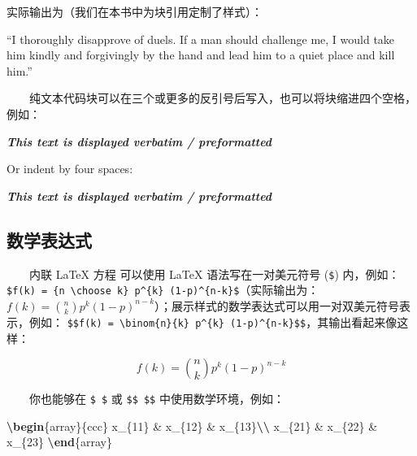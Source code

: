\documentclass[
  12pt,
]{krantz}
\newenvironment{Shaded}{\begin{snugshade}}{\end{snugshade}}
\newcommand{\ExtensionTok}[1]{#1}
\newcommand{\InformationTok}[1]{\textcolor[rgb]{0.56,0.35,0.01}{\textbf{\textit{#1}}}}
\newcommand{\KeywordTok}[1]{\textcolor[rgb]{0.13,0.29,0.53}{\textbf{#1}}}
\newcommand{\NormalTok}[1]{#1}
\newcommand{\SpecialCharTok}[1]{\textcolor[rgb]{0.81,0.36,0.00}{\textbf{#1}}}
\newcommand{\SpecialStringTok}[1]{\textcolor[rgb]{0.31,0.60,0.02}{#1}}
\renewenvironment{quote}{\begin{VF}}{\end{VF}}
\theoremstyle{definition}
\theoremstyle{definition}
\theoremstyle{definition}
\theoremstyle{definition}
\theoremstyle{remark}
\begin{document}
实际输出为（我们在本书中为块引用定制了样式）：

\begin{quote}
``I thoroughly disapprove of duels. If a man should challenge me,
I would take him kindly and forgivingly by the hand and lead him
to a quiet place and kill him.''

\end{quote}

  纯文本代码块可以在三个或更多的反引号后写入，也可以将块缩进四个空格，例如：

\begin{Shaded}
\begin{Highlighting}[]
\InformationTok{\textasciigrave{}\textasciigrave{}\textasciigrave{}}
\InformationTok{This text is displayed verbatim / preformatted}
\InformationTok{\textasciigrave{}\textasciigrave{}\textasciigrave{}}

\NormalTok{Or indent by four spaces:}

\InformationTok{    This text is displayed verbatim / preformatted}
\end{Highlighting}
\end{Shaded}

\hypertarget{ux6570ux5b66ux8868ux8fbeux5f0f}{%
\subsection{数学表达式}\label{ux6570ux5b66ux8868ux8fbeux5f0f}}

  内联 LaTeX 方程 可以使用 LaTeX 语法写在一对美元符号 (\texttt{\$}) 内，例如：\texttt{\$f(k)\ =\ \{n\ \textbackslash{}choose\ k\}\ p\^{}\{k\}\ (1-p)\^{}\{n-k\}\$}（实际输出为：\(f(k)=\binom{n}{k}p^{k}(1-p)^{n-k}\)）；展示样式的数学表达式可以用一对双美元符号表示，例如： \texttt{\$\$f(k)\ =\ \textbackslash{}binom\{n\}\{k\}\ p\^{}\{k\}\ (1-p)\^{}\{n-k\}\$\$}，其输出看起来像这样：

\[f\left(k\right)=\binom{n}{k}p^k\left(1-p\right)^{n-k}\]

  你也能够在 \texttt{\$\ \$} 或 \texttt{\$\$\ \$\$} 中使用数学环境，例如：

\begin{Shaded}
\begin{Highlighting}[]
\SpecialStringTok{$$}\KeywordTok{\textbackslash{}begin}\NormalTok{\{}\ExtensionTok{array}\NormalTok{\}}\SpecialStringTok{\{ccc\}}
\SpecialStringTok{x\_\{11\} \& x\_\{12\} \& x\_\{13\}}\SpecialCharTok{\textbackslash{}\textbackslash{}}
\SpecialStringTok{x\_\{21\} \& x\_\{22\} \& x\_\{23\}}
\KeywordTok{\textbackslash{}end}\NormalTok{\{}\ExtensionTok{array}\NormalTok{\}}\SpecialStringTok{$$}
\end{Highlighting}
\end{Shaded}
\end{document}
